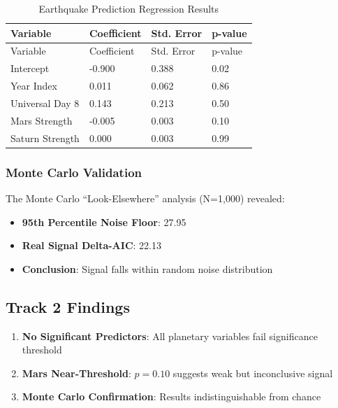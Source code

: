 \documentclass[
  11pt,
  a4paper,
  oneside,
  openany]{article}
\providecommand{\tightlist}{%
  \setlength{\itemsep}{0pt}\setlength{\parskip}{0pt}}\usepackage{longtable,booktabs,array}
\begin{document}
\begin{longtable}[]{@{}llll@{}}
\caption{Earthquake Prediction Regression
Results}\label{tbl-earthquake}\tabularnewline
\toprule\noalign{}
Variable & Coefficient & Std. Error & p-value \\
\midrule\noalign{}
\endfirsthead
\toprule\noalign{}
Variable & Coefficient & Std. Error & p-value \\
\midrule\noalign{}
\endhead
\bottomrule\noalign{}
\endlastfoot
Intercept & -0.900 & 0.388 & 0.02 \\
Year Index & 0.011 & 0.062 & 0.86 \\
Universal Day 8 & 0.143 & 0.213 & 0.50 \\
Mars Strength & -0.005 & 0.003 & 0.10 \\
Saturn Strength & 0.000 & 0.003 & 0.99 \\
\end{longtable}

\subsubsection{Monte Carlo Validation}\label{monte-carlo-validation}

The Monte Carlo ``Look-Elsewhere'' analysis (N=1,000) revealed:

\begin{itemize}
\tightlist
\item
  \textbf{95th Percentile Noise Floor}: 27.95
\item
  \textbf{Real Signal Delta-AIC}: 22.13
\item
  \textbf{Conclusion}: Signal falls within random noise distribution
\end{itemize}

\subsection{Track 2 Findings}\label{track-2-findings}

\begin{enumerate}
\def\labelenumi{\arabic{enumi}.}
\tightlist
\item
  \textbf{No Significant Predictors}: All planetary variables fail
  significance threshold
\item
  \textbf{Mars Near-Threshold}: \(p = 0.10\) suggests weak but
  inconclusive signal
\item
  \textbf{Monte Carlo Confirmation}: Results indistinguishable from
  chance
\end{enumerate}
\end{document}
